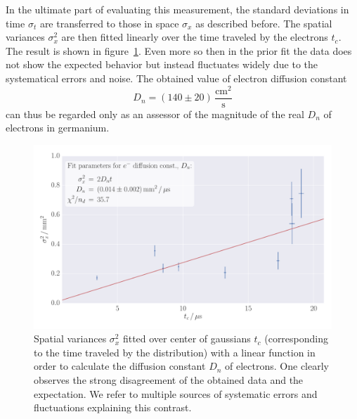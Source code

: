 In the ultimate part of evaluating this measurement, the standard deviations in 
time $\sigma_t$ are transferred to those in space $\sigma_x$ as described before. 
The spatial variances $\sigma_x^2$ are then fitted linearly over the time 
traveled by the electrons $t_c$. The result is shown in figure~\ref{fig:h_s_D_d}.
Even more so then in the prior fit the data does not show the expected behavior 
but instead fluctuates widely due to the systematical errors and noise. 
The obtained value of electron diffusion constant 
\begin{equation}
    D_n = (140 \pm 20)\, \mathrm{\frac{cm^2}{s}} 
\end{equation}
can thus be regarded only as an assessor of the magnitude of the real $D_n$ 
of electrons in germanium. 
\begin{figure}
    \includegraphics[width=1.0\textwidth]{figures/haynes_shockley_D_d}
    \caption{
        Spatial variances $\sigma_x^2$ fitted over center of gaussians $t_c$ 
        (corresponding to the time traveled by the distribution) with a linear 
        function in order to calculate the diffusion constant $D_n$ of electrons. 
        One clearly observes the strong disagreement of the obtained data and the 
        expectation. We refer to multiple sources of systematic errors and fluctuations 
        explaining this contrast. 
        }
    \label{fig:h_s_D_d}
\end{figure}
\FloatBarrier

